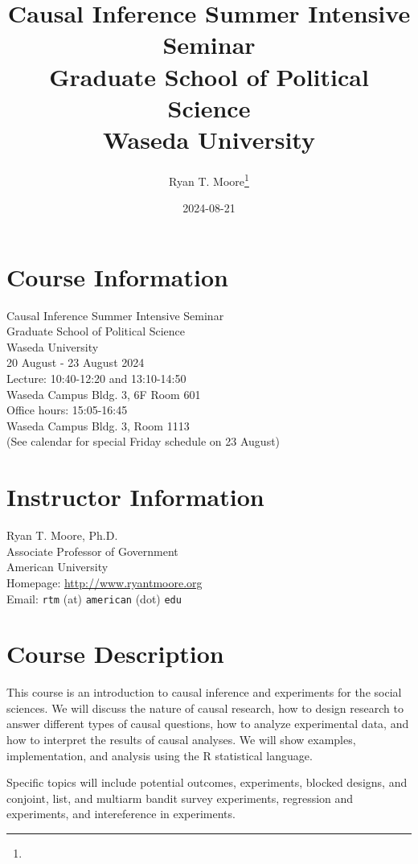 \documentclass[11pt]{article}
\title{Causal Inference Summer Intensive Seminar \\ Graduate School of Political Science \\ Waseda University }
\author{Ryan T. Moore\footnote{\rtmaddr}}
\date{2024-08-21}
\newcommand{\firstdate}{20 }
\newcommand{\thisyear}{2024}
\begin{document}
\maketitle

\section*{Course Information}
Causal Inference Summer Intensive Seminar \\ Graduate School of Political Science \\ Waseda University \\
\firstdate August - 23 August \thisyear\\
Lecture: 10:40-12:20 and 13:10-14:50 \\
Waseda Campus Bldg. 3, 6F Room 601 \\
Office hours: 15:05-16:45  \\
Waseda Campus Bldg. 3, Room 1113 \\

(See calendar for special Friday schedule on 23 August)

\section*{Instructor Information}
Ryan T. Moore, Ph.D. \\
Associate Professor of Government\\
American University\\
Homepage: \url{http://www.ryantmoore.org} \\
Email: {\tt rtm} (at) {\tt american} (dot) {\tt edu} 

\vspace{.1in}

\section*{Course Description}

This course is an introduction to causal inference and experiments for the social sciences. We will discuss the nature of causal research, how to design research to answer different types of causal questions, how to analyze experimental data, and how to interpret the results of causal analyses. We will show examples, implementation, and analysis using the R statistical language.

Specific topics will include potential outcomes, experiments, blocked designs, and conjoint, list, and multiarm bandit survey experiments, regression and experiments, and intereference in experiments.
\end{document}
